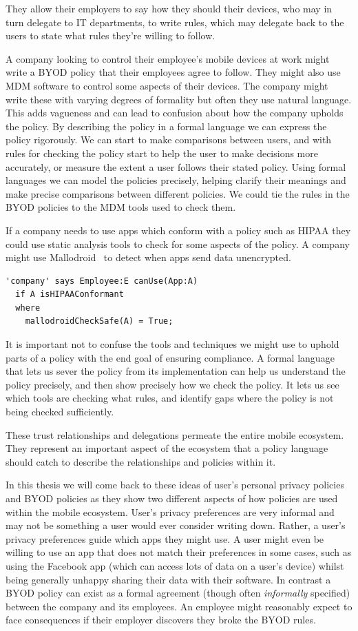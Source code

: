 \documentclass[thesis.tex]{subfiles}
\begin{document}
They allow their employers to say how they should their devices, who
may in turn delegate to IT departments, to write rules, which may
delegate back to the users to state what rules they're willing to
follow.

A company looking to control their employee's mobile devices at work
might write a \ac{BYOD} policy that their employees agree to
follow. They might also use \ac{MDM} software to control some aspects
of their devices. The company might write these with varying degrees
of formality but often they use natural language. This adds vagueness
and can lead to confusion about how the company upholds the policy. By
describing the policy in a formal language we can express the policy
rigorously. We can start to make comparisons between users, and with
rules for checking the policy start to help the user to make decisions
more accurately, or measure the extent a user follows their stated
policy. Using formal languages we can model the policies precisely,
helping clarify their meanings and make precise comparisons between
different policies. We could tie the rules in the \ac{BYOD} policies
to the \ac{MDM} tools used to check them.

If a company needs to use apps which conform with a policy such as
\ac{HIPAA} they could use static analysis tools to check for some
aspects of the policy.  A company might use
Mallodroid~\cite{fahl_why_2012} to detect when apps send data unencrypted.  
%
\begin{lstlisting}
'company' says Employee:E canUse(App:A)
  if A isHIPAAConformant
  where
    mallodroidCheckSafe(A) = True;
\end{lstlisting}
%
It is important not to confuse the tools and
techniques we might use to uphold parts of a policy with the end
goal of ensuring compliance.  A formal language that
lets us sever the policy from its implementation can help us
understand the policy precisely, and then show precisely how we check the
policy.  It lets us see which tools are checking what rules, and identify gaps where the policy is not
being checked sufficiently.

These trust relationships and delegations permeate the entire mobile
ecosystem.  They represent an important aspect of the ecosystem that a
policy language should catch to describe the
relationships and policies within it.


In this thesis we will come back to these ideas of user's personal
privacy policies and BYOD policies as they show two different aspects
of how policies are used within the mobile ecosystem.
%
User's privacy preferences are very informal and may not be something
a user would ever consider writing down.  Rather, a user's privacy
preferences guide which apps they might use. A user might even be
willing to use an app that does not match their preferences in some
cases, such as using the Facebook app (which can access lots of data
on a user's device) whilst being generally unhappy sharing their data
with their software.
%
In contrast a BYOD policy can exist as a formal agreement (though
often \emph{informally} specified) between the company and its
employees.  An employee might reasonably expect to face consequences
if their employer discovers they broke the BYOD rules.
\end{document}
